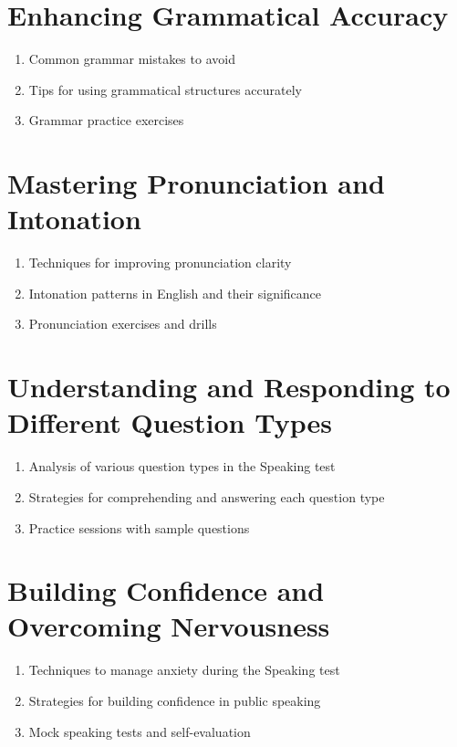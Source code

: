 \documentclass{article}
\begin{document}
\section{Enhancing Grammatical Accuracy}
\begin{enumerate}[label=\alph*)]
    \item Common grammar mistakes to avoid
    \item Tips for using grammatical structures accurately
    \item Grammar practice exercises
\end{enumerate}

\section{Mastering Pronunciation and Intonation}
\begin{enumerate}[label=\alph*)]
    \item Techniques for improving pronunciation clarity
    \item Intonation patterns in English and their significance
    \item Pronunciation exercises and drills
\end{enumerate}

\section{Understanding and Responding to Different Question Types}
\begin{enumerate}[label=\alph*)]
    \item Analysis of various question types in the Speaking test
    \item Strategies for comprehending and answering each question type
    \item Practice sessions with sample questions
\end{enumerate}

\section{Building Confidence and Overcoming Nervousness}
\begin{enumerate}[label=\alph*)]
    \item Techniques to manage anxiety during the Speaking test
    \item Strategies for building confidence in public speaking
    \item Mock speaking tests and self-evaluation
\end{enumerate}
\end{document}
